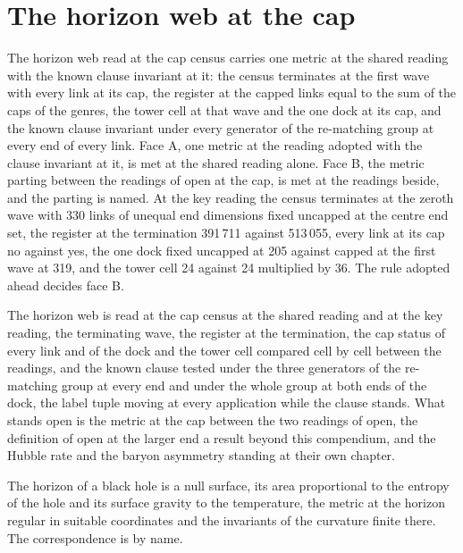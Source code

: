 \section{The horizon web at the cap}\label{mod:X-3-D538816-w-zcph}
\begin{chwall}\label{box:X-3-D538816-w-zcph:1}
The horizon web read at the cap census carries one metric at the shared reading with the known clause invariant at it: the census terminates at the first wave with every link at its cap, the register at the capped links equal to the sum of the caps of the genres, the tower cell at that wave and the one dock at its cap, and the known clause invariant under every generator of the re-matching group at every end of every link. Face A, one metric at the reading adopted with the clause invariant at it, is met at the shared reading alone. Face B, the metric parting between the readings of open at the cap, is met at the readings beside, and the parting is named. At the key reading the census terminates at the zeroth wave with 330 links of unequal end dimensions fixed uncapped at the centre end set, the register at the termination 391\,711 against 513\,055, every link at its cap no against yes, the one dock fixed uncapped at 205 against capped at the first wave at 319, and the tower cell 24 against 24 multiplied by 36. The rule adopted ahead decides face B.
\end{chwall}
The horizon web is read at the cap census at the shared reading and at the key reading, the terminating wave, the register at the termination, the cap status of every link and of the dock and the tower cell compared cell by cell between the readings, and the known clause tested under the three generators of the re-matching group at every end and under the whole group at both ends of the dock, the label tuple moving at every application while the clause stands. What stands open is the metric at the cap between the two readings of open, the definition of open at the larger end a result beyond this compendium, and the Hubble rate and the baryon asymmetry standing at their own chapter.
\begin{chbridge}
The horizon of a black hole is a null surface, its area proportional to the entropy of the hole and its surface gravity to the temperature, the metric at the horizon regular in suitable coordinates and the invariants of the curvature finite there. The correspondence is by name.
\end{chbridge}
